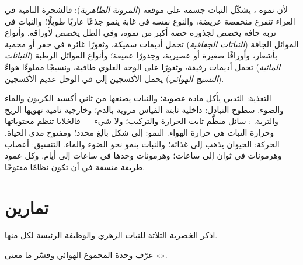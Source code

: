 \begin{proposition}\label{prop:b1:flowering-plant-organization:plasticity}
لأن نموه  ، يشكّل النبات جسمه على موقعه
(\emph{المرونة الظاهرية}): فالشجرة النامية
في العراء تتفرع منخفضة عريضة، والنوع نفسه في غابة ينمو جذعًا عاريًا
طويلًا؛ والنبات في تربة جافة يخصص لجذوره حصة أكبر من نموه، وفي الظل
يخصص لأوراقه. وأنواع الموائل الجافة (\emph{النباتات
الجفافية}) تحمل أديمات سميكة، وثغورًا غائرة في حفر
أو محمية بأشعار، وأوراقًا صغيرة أو عصيرية، وجذورًا عميقة؛ وأنواع
الموائل الرطبة (\emph{النباتات المائية}) تحمل أديمات
رقيقة، وثغورًا على الوجه العلوي  طافية، ونسيجًا مملوءًا هواءً
(\emph{النسيج الهوائي}) يحمل الأكسجين إلى
 في الوحل عديم الأكسجين.
\end{proposition}

\begin{example}\label{ex:b1:flowering-plant-organization:comparison}
التغذية: الثديي يأكل مادة عضوية؛ والنبات يصنعها من ثاني أكسيد
الكربون والماء والضوء. سطوح التبادل: داخلية ثابتة القياس مروية
بالدم؛ وخارجية نامية تهويها الريح والتربة. : سائل
منظَّم ثابت الحرارة والتركيب؛ ولا شيء --- فالخلايا تنظم محتوياتها
وحرارة النبات هي حرارة الهواء. النمو: إلى شكل بالغ محدد؛ ومفتوح
 مدى الحياة. الحركة: الحيوان يذهب إلى غذائه؛ والنبات ينمو نحو
الضوء والماء. التنسيق: أعصاب وهرمونات في ثوان إلى ساعات؛ وهرمونات
وحدها في ساعات إلى أيام. وكل عمود طريقة متسقة في أن تكون نظامًا
مفتوحًا.
\end{example}

\section{تمارين}

\begin{exercise}[$\star$]\label{exo:b1:flowering-plant-organization:1}
اذكر  الخضرية الثلاثة للنبات الزهري والوظيفة الرئيسة لكل
منها.
\end{exercise}

\begin{exercise}[$\star$]\label{exo:b1:flowering-plant-organization:2}
عرّف وحدة المجموع الهوائي وفسّر ما معنى «».
\end{exercise}

